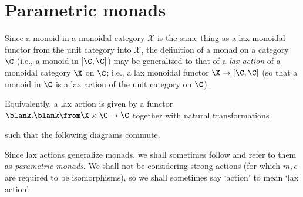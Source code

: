 \chapter{Parametric monads}
\label{ChapParametricMonads}

Since a monoid in a monoidal category $\mathcal X$ is the same thing as a lax monoidal functor from the unit category into $\mathcal X$, the definition of a monad on a category $\C$ (i.e., a monoid in $[\C,\C]$) may be generalized to that of a \emph{lax action} \cite{LaxActions} of a monoidal category $\X$ on $\C$; i.e., a lax monoidal functor $\X \to [\C,\C]$ (so that a monoid in $\C$ is a lax action of the unit category on $\C$).

Equivalently, a lax action is given by a functor $\blank.\blank \from \X \times \C \to \C$ together with natural transformations
such that the following diagrams commute.
Since lax actions generalize monads, we shall sometimes follow \Mellies \cite{ParametricMonads} and refer to them as \emph{parametric monads}.
We shall not be considering strong actions (for which $m,e$ are required to be isomorphisms), so we shall sometimes say `action' to mean `lax action'.

